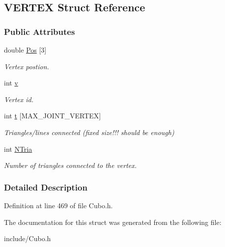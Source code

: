\hypertarget{structVERTEX}{\subsection{\-V\-E\-R\-T\-E\-X \-Struct \-Reference}
\label{structVERTEX}
}
\subsubsection*{\-Public \-Attributes}
\begin{DoxyCompactItemize}
\item 
\hypertarget{structVERTEX_a863738e46f14b3bfc674ad87d35f143d}{double \hyperlink{structVERTEX_a863738e46f14b3bfc674ad87d35f143d}{\-Pos} \mbox{[}3\mbox{]}}\label{structVERTEX_a863738e46f14b3bfc674ad87d35f143d}

\begin{DoxyCompactList}\small\item\em \-Vertex postion. \end{DoxyCompactList}\item 
\hypertarget{structVERTEX_ac8859e8c1ce357c4c8b37bbb1936ba1c}{int \hyperlink{structVERTEX_ac8859e8c1ce357c4c8b37bbb1936ba1c}{v}}\label{structVERTEX_ac8859e8c1ce357c4c8b37bbb1936ba1c}

\begin{DoxyCompactList}\small\item\em \-Vertex id. \end{DoxyCompactList}\item 
\hypertarget{structVERTEX_ad82192d51ed2fc5973d034b41d0e4f27}{int \hyperlink{structVERTEX_ad82192d51ed2fc5973d034b41d0e4f27}{t} \mbox{[}\-M\-A\-X\-\_\-\-J\-O\-I\-N\-T\-\_\-\-V\-E\-R\-T\-E\-X\mbox{]}}\label{structVERTEX_ad82192d51ed2fc5973d034b41d0e4f27}

\begin{DoxyCompactList}\small\item\em \-Triangles/lines connected (fixed size!!! should be enough) \end{DoxyCompactList}\item 
\hypertarget{structVERTEX_a12a47df39f8f45d8c6da40a2238b1033}{int \hyperlink{structVERTEX_a12a47df39f8f45d8c6da40a2238b1033}{\-N\-Tria}}\label{structVERTEX_a12a47df39f8f45d8c6da40a2238b1033}

\begin{DoxyCompactList}\small\item\em \-Number of triangles connected to the vertex. \end{DoxyCompactList}\end{DoxyCompactItemize}


\subsubsection{\-Detailed \-Description}


\-Definition at line 469 of file \-Cubo.\-h.



\-The documentation for this struct was generated from the following file\-:\begin{DoxyCompactItemize}
\item 
include/\-Cubo.\-h\end{DoxyCompactItemize}
